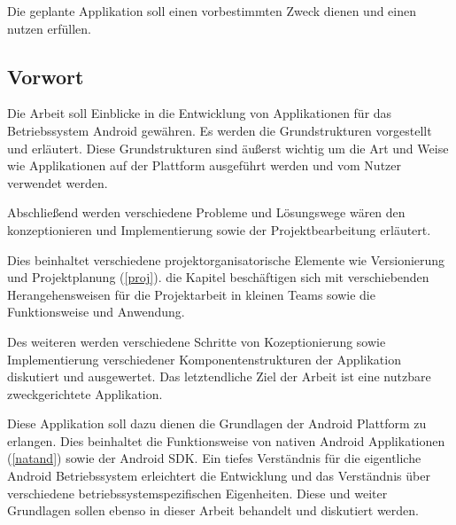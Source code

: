 Die geplante Applikation soll einen vorbestimmten Zweck dienen und einen nutzen erfüllen.

\subsection{Vorwort}
Die Arbeit soll Einblicke in die Entwicklung von Applikationen für das Betriebssystem Android gewähren. Es werden die Grundstrukturen vorgestellt und erläutert. Diese Grundstrukturen sind äußerst wichtig um die Art und Weise wie Applikationen auf der Plattform ausgeführt werden und vom Nutzer verwendet werden.

Abschließend werden verschiedene Probleme und Lösungswege wären den konzeptionieren und Implementierung sowie der Projektbearbeitung erläutert.

Dies beinhaltet verschiedene projektorganisatorische Elemente wie Versionierung und Projektplanung (\ref{proj}). die Kapitel beschäftigen sich mit verschiebenden Herangehensweisen für die Projektarbeit in kleinen Teams sowie die Funktionsweise und Anwendung.

Des weiteren werden verschiedene Schritte von Kozeptionierung sowie Implementierung verschiedener Komponentenstrukturen der Applikation diskutiert und ausgewertet. Das letztendliche Ziel der Arbeit ist eine nutzbare zweckgerichtete Applikation.

Diese Applikation soll dazu dienen die Grundlagen der Android Plattform zu erlangen. Dies beinhaltet die Funktionsweise von nativen Android Applikationen (\ref{natand}) sowie der Android SDK. Ein tiefes Verständnis für die eigentliche Android Betriebssystem erleichtert die Entwicklung und das Verständnis über verschiedene betriebssystemspezifischen Eigenheiten. Diese und weiter Grundlagen sollen ebenso in dieser Arbeit behandelt und diskutiert werden.
